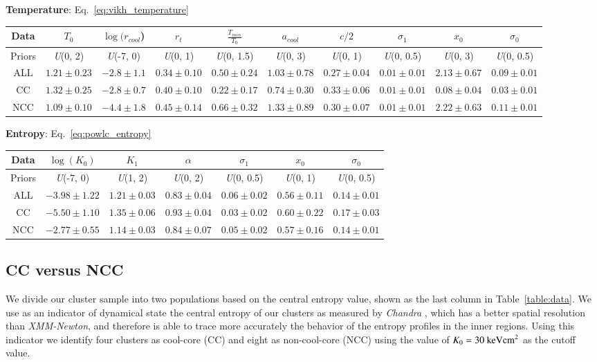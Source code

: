 \documentclass[traditabstract   ]{aa} %
\begin{document}
\begin{table}
\begin{center}
{\bf Temperature}: Eq.~\eqref{eq:vikh_temperature}

\begin{tabular}{ c | c c c c c c | c c c }
Data & $T_0$ & $\log(r_{cool}$) & $r_t$ & $\frac{T_{min}}{T_0}$ & $a_{cool}$ & $c/2$  & $\sigma_1$ & $x_0$ & $\sigma_0$ \\ 
\hline
Priors & \emph{U}(0, 2) & \emph{U}(-7, 0) & \emph{U}(0, 1) & \emph{U}(0, 1.5)  & \emph{U}(0, 3) & \emph{U}(0, 1) & \emph{U}(0, 0.5) & \emph{U}(0, 3) & \emph{U}(0, 0.5) \\

ALL & $1.21 \pm 0.23$ &$-2.8 \pm 1.1$ &$0.34 \pm 0.10$ &$0.50 \pm 0.24$ &$1.03 \pm 0.78$ &$0.27 \pm 0.04$ &$0.01 \pm 0.01$ &$2.13 \pm 0.67$ &$0.09 \pm 0.01$ \\
CC & $1.32 \pm 0.25$ &$-2.8 \pm 0.7$ &$0.40 \pm 0.10$ &$0.22 \pm 0.17$ &$0.74 \pm 0.30$ &$0.33 \pm 0.06$ &$0.01 \pm 0.01$ &$0.08 \pm 0.04$ &$0.03 \pm 0.01$ \\
NCC & $1.09 \pm 0.10$ &$-4.4 \pm 1.8$ &$0.45 \pm 0.14$ &$0.66 \pm 0.32$ &$1.33 \pm 0.89$ &$0.30 \pm 0.07$ &$0.01 \pm 0.01$ &$2.22 \pm 0.63$ &$0.11 \pm 0.01$ \\
\end{tabular}

{\bf Entropy}: Eq.~\eqref{eq:powlc_entropy}

\begin{tabular}{ c | c c c | c c c }
Data & $\log(K_0)$ & $K_1$ & $\alpha$ & $\sigma_1$ & $x_0$ & $\sigma_0$ \\ 
\hline
Priors & \emph{U}(-7, 0) & \emph{U}(1, 2) & \emph{U}(0, 2) & \emph{U}(0, 0.5) & \emph{U}(0, 1) & \emph{U}(0, 0.5) \\

ALL & $-3.98 \pm 1.22$ & $1.21 \pm 0.03$ & $0.83 \pm 0.04$ & $0.06 \pm 0.02$ & $0.56 \pm 0.11$ & $0.14 \pm 0.01$ \\
CC & $-5.50 \pm 1.10$ & $1.35 \pm 0.06$ & $0.93 \pm 0.04$ & $0.03 \pm 0.02$ & $0.60 \pm 0.22$ & $0.17 \pm 0.03$ \\
NCC & $-2.77 \pm 0.55$ & $1.14 \pm 0.03$ & $0.84 \pm 0.07$ & $0.05 \pm 0.02$ & $0.57 \pm 0.16$ & $0.14 \pm 0.01$ \\
\end{tabular}

\end{center}
\end{table}


\subsection{CC versus NCC}
\label{sec:CC_NCC}
We divide our cluster sample into two populations based on the central entropy value, shown as the last column in Table~\ref{table:data}. We use as an indicator of dynamical state the central entropy of our clusters as measured by \textit{Chandra} \citep{cavagnolo+09}, which has a better spatial resolution than \textit{XMM-Newton}, and therefore is able to trace more accurately the behavior of the entropy profiles in the inner regions.
Using this indicator we identify four clusters as cool-core (CC) and eight as non-cool-core (NCC) using the value of $K_0 = 30 \ \rm{keV cm}^2$ as the cutoff value.
\end{document}
